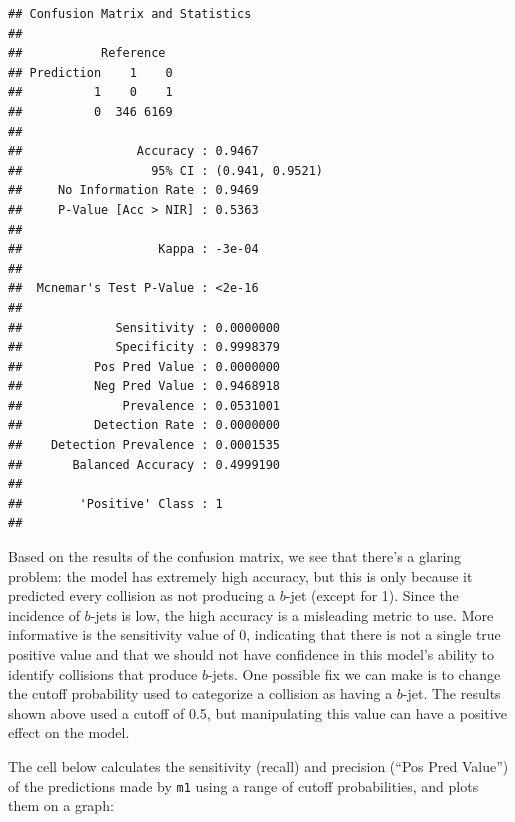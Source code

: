 \documentclass[
]{article}
\begin{document}
\begin{verbatim}
## Confusion Matrix and Statistics
## 
##           Reference
## Prediction    1    0
##          1    0    1
##          0  346 6169
##                                          
##                Accuracy : 0.9467         
##                  95% CI : (0.941, 0.9521)
##     No Information Rate : 0.9469         
##     P-Value [Acc > NIR] : 0.5363         
##                                          
##                   Kappa : -3e-04         
##                                          
##  Mcnemar's Test P-Value : <2e-16         
##                                          
##             Sensitivity : 0.0000000      
##             Specificity : 0.9998379      
##          Pos Pred Value : 0.0000000      
##          Neg Pred Value : 0.9468918      
##              Prevalence : 0.0531001      
##          Detection Rate : 0.0000000      
##    Detection Prevalence : 0.0001535      
##       Balanced Accuracy : 0.4999190      
##                                          
##        'Positive' Class : 1              
## 
\end{verbatim}

Based on the results of the confusion matrix, we see that there's a
glaring problem: the model has extremely high accuracy, but this is only
because it predicted every collision as not producing a \(b\)-jet
(except for 1). Since the incidence of \(b\)-jets is low, the high
accuracy is a misleading metric to use. More informative is the
sensitivity value of 0, indicating that there is not a single true
positive value and that we should not have confidence in this model's
ability to identify collisions that produce \(b\)-jets. One possible fix
we can make is to change the cutoff probability used to categorize a
collision as having a \(b\)-jet. The results shown above used a cutoff
of 0.5, but manipulating this value can have a positive effect on the
model.

The cell below calculates the sensitivity (recall) and precision (``Pos
Pred Value'') of the predictions made by \texttt{m1} using a range of
cutoff probabilities, and plots them on a graph:
\end{document}
